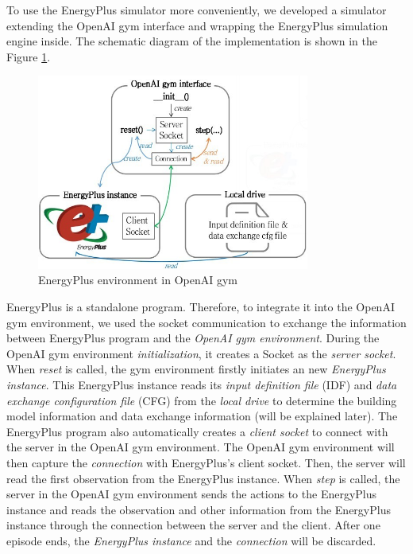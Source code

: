 \documentclass{article}
\begin{document}
To use the EnergyPlus simulator more conveniently, we developed a simulator extending the OpenAI gym interface and wrapping the EnergyPlus simulation engine inside. The schematic diagram of the implementation is shown in the Figure \ref{fig:eplus_env}.  
\begin{figure}[h]
\centering
\includegraphics[width=0.8\textwidth]{eplus_env.jpg}
\caption{EnergyPlus environment in OpenAI gym}
\label{fig:eplus_env}
\end{figure} 

EnergyPlus is a standalone program. Therefore, to integrate it into the OpenAI gym environment, we used the socket communication to exchange the information between EnergyPlus program and the \textit{OpenAI gym environment}. During the OpenAI gym environment \textit{initialization}, it creates a Socket as the \textit{server socket}. When \textit{reset} is called, the gym environment firstly initiates an new \textit{EnergyPlus instance}. This EnergyPlus instance reads its \textit{input definition file} (IDF) and \textit{data exchange configuration file} (CFG) from the \textit{local drive} to determine the building model information and data exchange information (will be explained later). The EnergyPlus program also automatically creates a \textit{client socket} to connect with the server in the OpenAI gym environment. The OpenAI gym environment will then capture the \textit{connection} with EnergyPlus's client socket. Then, the server will read the first observation from the EnergyPlus instance. When \textit{step} is called, the server in the OpenAI gym environment sends the actions to the EnergyPlus instance and reads the observation and other information from the EnergyPlus instance through the connection between the server and the client. After one episode ends, the \textit{EnergyPlus instance} and the \textit{connection} will be discarded. 
\end{document}
